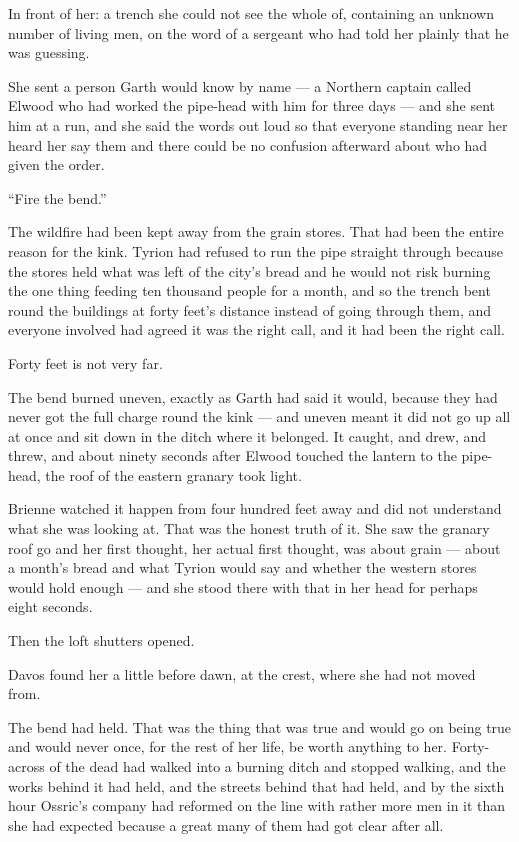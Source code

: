 In front of her: a trench she could not see the whole of, containing an unknown number of living men, on the word of a sergeant who had told her plainly that he was guessing.

She sent a person Garth would know by name — a Northern captain called Elwood who had worked the pipe-head with him for three days — and she sent him at a run, and she said the words out loud so that everyone standing near her heard her say them and there could be no confusion afterward about who had given the order.

“Fire the bend.”

\sceneBreak

The wildfire had been kept away from the grain stores. That had been the entire reason for the kink. Tyrion had refused to run the pipe straight through because the stores held what was left of the city’s bread and he would not risk burning the one thing feeding ten thousand people for a month, and so the trench bent round the buildings at forty feet’s distance instead of going through them, and everyone involved had agreed it was the right call, and it had been the right call.

Forty feet is not very far.

The bend burned uneven, exactly as Garth had said it would, because they had never got the full charge round the kink — and uneven meant it did not go up all at once and sit down in the ditch where it belonged. It caught, and drew, and threw, and about ninety seconds after Elwood touched the lantern to the pipe-head, the roof of the eastern granary took light.

Brienne watched it happen from four hundred feet away and did not understand what she was looking at. That was the honest truth of it. She saw the granary roof go and her first thought, her actual first thought, was about grain — about a month’s bread and what Tyrion would say and whether the western stores would hold enough — and she stood there with that in her head for perhaps eight seconds.

Then the loft shutters opened.

\sceneBreak

Davos found her a little before dawn, at the crest, where she had not moved from.

The bend had held. That was the thing that was true and would go on being true and would never once, for the rest of her life, be worth anything to her. Forty-across of the dead had walked into a burning ditch and stopped walking, and the works behind it had held, and the streets behind that had held, and by the sixth hour Ossric’s company had reformed on the line with rather more men in it than she had expected because a great many of them had got clear after all.

